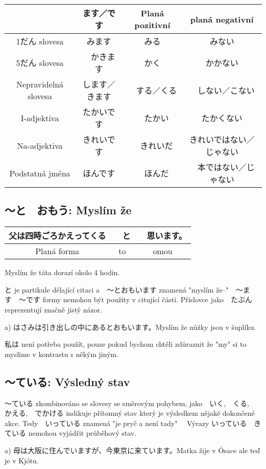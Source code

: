 \begin{center}
\begin{tabular}{|c|c|c|c|}
\hline
	　&ます／です&Planá pozitivní& planá negativní\\
	\hline
1だん slovesa　&みます　&みる　&みない\\
\hline
5だん slovesa&　かきます　&かく　&かかない\\
\hline
Nepravidelná slovesa&	します／きます&　する／くる&　しない／こない\\
\hline
I-adjektiva &	たかいです&　たかい　&たかくない\\
\hline
Na-adjektiva 	&きれいです&　きれいだ　&きれいではない／じゃない\\
\hline
Podstatná jména&	ほんです&　ほんだ&　本ではない／じゃない\\
\hline
\end{tabular}	
\end{center}

\subsection{〜と　おもう: Myslím že}

\begin{center}
\begin{tabular}{|c|c|c|}
\hline
父は四時ごろかえってくる&　と&　思います。\\
\hline
Planá forma & to & omou\\
\hline
\end{tabular}
\end{center}
Myslím že táta dorazí okolo 4 hodin.


と je partikule dělající citaci a　〜とおもいます znamená "myslím že--"　〜ます　〜です formy nemohou být použity v citující části. Příslovce jako　たぶん reprezentují značně jistý názor.

a) はさみは引き出しの中にあるとおもいます。Myslím že nůžky jsou v šuplíku.


私は není potřeba použít, pouze pokud bychom chtěli zdůraznit že "my" si to myslíme v kontrastu s někým jiným.


\subsection{〜ている: Výsledný stav}

〜ている zkombinováno se slovesy se směrovým pohybem, jako　いく,　くる,　かえる,　でかける indikuje přítomný stav který je výsledkem nějaké dokončené akce. Tedy　いっている znamená "je pryč a není tady" 　Výrazy いっている　きている nemohou vyjádřit průběhový stav.


a) 母は大阪に住んでいますが、今東京に来ています。Matka žije v Ósace ale teď je v Kjótu.



















